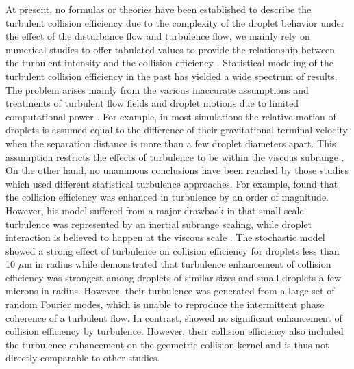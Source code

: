 At present, no formulas or theories have been established to describe the turbulent collision efficiency due to the complexity of the droplet behavior under the effect of the disturbance flow and turbulence flow, we mainly rely on numerical studies to offer tabulated values to provide the relationship between the turbulent intensity and the collision efficiency \citep[for example, ][]{Pinsky2008, Wang2008}. Statistical modeling of the turbulent collision efficiency in the past has yielded a wide spectrum of results. The problem arises mainly from the various inaccurate assumptions and treatments of turbulent flow fields and droplet motions due to limited computational power \citep{Grabowski2013}. For example, in most simulations the relative motion of droplets is assumed equal to the difference of their gravitational terminal velocity when the separation distance is more than a few droplet diameters apart. This assumption restricts the effects of turbulence to be within the viscous subrange \citep{Pinsky1997}. On the other hand, no unanimous conclusions have been reached by those studies which used different statistical turbulence approaches. For example, \citet{Almeida1979} found that the collision efficiency was enhanced in turbulence by an order of magnitude. However, his model suffered from a major drawback in that small-scale turbulence was represented by an inertial subrange scaling, while droplet interaction is believed to happen at the viscous scale \citep{Pinsky1997}. The \citet{Pinsky2004} stochastic model showed a strong effect of turbulence on collision efficiency for droplets less than 10 $\mu$m in radius while \citet{Pinsky2007} demonstrated that turbulence enhancement of collision efficiency was strongest among droplets of similar sizes and small droplets a few microns in radius. However, their turbulence was generated from a large set of random Fourier modes, which is unable to reproduce the intermittent phase coherence of a turbulent flow. In contrast, \citet{Koziol1996} showed no significant enhancement of collision efficiency by turbulence. However, their collision efficiency also included the turbulence enhancement on the geometric collision kernel and is thus not directly comparable to other studies. 

